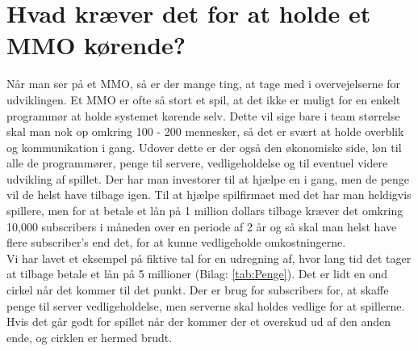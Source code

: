 \chapter{Hvad kræver det for at holde et MMO kørende?}
Når man ser på et MMO, så er der mange ting, at tage med i overvejelserne for udviklingen. Et MMO er ofte så stort et spil, at det ikke er muligt for en enkelt programmør at holde systemet kørende selv. Dette vil sige bare i team størrelse skal man nok op omkring 100 - 200 mennesker\cite{NOMMO}, så det er svært at holde overblik og kommunikation i gang. Udover dette er der også den økonomiske side, løn til alle de programmører, penge til servere, vedligeholdelse og til eventuel videre udvikling af spillet. Der har man investorer til at hjælpe en i gang, men de penge vil de helst have tilbage igen. Til at hjælpe spilfirmaet med det har man heldigvis spillere, men for at betale et lån på 1 million dollars tilbage kræver det  omkring 10,000 subscribers i måneden over en periode af 2 år\cite{Escapist} og så skal man helst have flere subscriber's end det, for at kunne vedligeholde omkostningerne.\\ 
Vi har lavet et eksempel på fiktive tal for en udregning af, hvor lang tid det tager at tilbage betale et lån på 5 millioner (Bilag: \ref{tab:Penge}). Det er lidt en ond cirkel når det kommer til det punkt. Der er brug for subscribers for, at skaffe penge til server vedligeholdelse, men serverne skal holdes vedlige for at spillerne. Hvis det går godt for spillet når der kommer der et overskud  ud af den anden ende, og cirklen er hermed brudt.